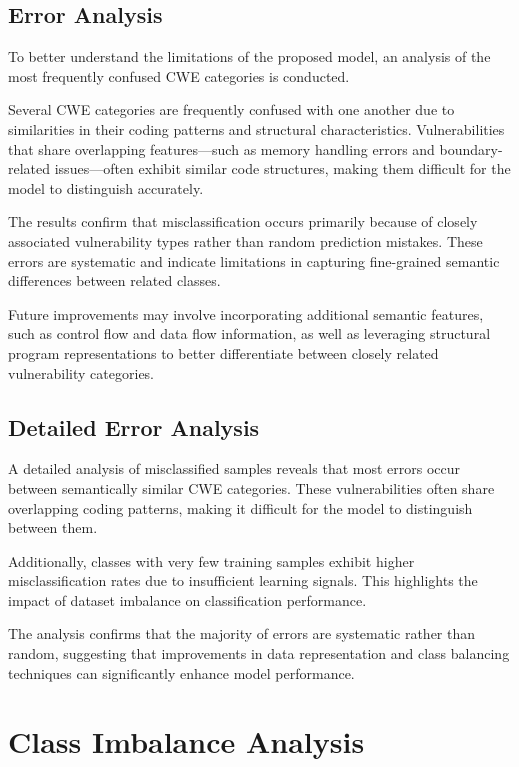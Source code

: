 \documentclass[conference]{IEEEtran}
\begin{document}
\subsection{Error Analysis}

To better understand the limitations of the proposed model, an analysis of the most frequently confused CWE categories is conducted.



Several CWE categories are frequently confused with one another due to similarities in their coding patterns and structural characteristics. Vulnerabilities that share overlapping features—such as memory handling errors and boundary-related issues—often exhibit similar code structures, making them difficult for the model to distinguish accurately.

The results confirm that misclassification occurs primarily because of closely associated vulnerability types rather than random prediction mistakes. These errors are systematic and indicate limitations in capturing fine-grained semantic differences between related classes.

Future improvements may involve incorporating additional semantic features, such as control flow and data flow information, as well as leveraging structural program representations to better differentiate between closely related vulnerability categories.

\subsection{Detailed Error Analysis}

A detailed analysis of misclassified samples reveals that most errors occur between semantically similar CWE categories. These vulnerabilities often share overlapping coding patterns, making it difficult for the model to distinguish between them.

Additionally, classes with very few training samples exhibit higher misclassification rates due to insufficient learning signals. This highlights the impact of dataset imbalance on classification performance.

The analysis confirms that the majority of errors are systematic rather than random, suggesting that improvements in data representation and class balancing techniques can significantly enhance model performance.
\section{Class Imbalance Analysis}
\end{document}

